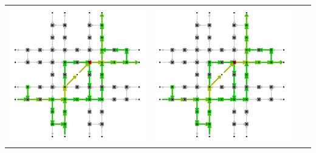 \begin{table}[b]
\begin{tabularx}{\textwidth}{|Y|Y|Y|Y|}
		\includegraphics[trim=0 0 0 -4,scale=0.155]{../gfx/data/AggrMobilityGraph1.png}  &
		\includegraphics[trim=0 0 0 -4,scale=0.155]{../gfx/data/AggrMobilityGraph2.png}  &

\end{tabularx}
\end{table}
